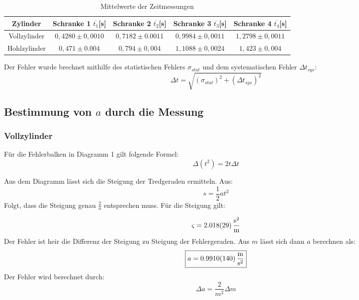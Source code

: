 \begin{table}[h!]
    \centering
    \begin{tabular}{c c c c c}
        \toprule
        Zylinder & Schranke 1 $\overline{t_1}$[s] & Schranke 2 $\overline{t_2}$[s] & Schranke 3 $\overline{t_3}$[s] & Schranke 4 $\overline{t_4}$[s] \\
        \midrule
        Vollzylinder & $0,4280 \pm 0,0010 $ & $ 0,7182 \pm 0.0011$ & $0,9984 \pm 0,0011 $ & $ 1,2798 \pm 0,0011$\\
        Hohlzylinder & $0,471 \pm 0.004$ & $0,794 \pm 0,004$ & $1,1088 \pm 0,0024$ & $1,423 \pm 0,004$\\
        \bottomrule
    \end{tabular}
    \caption{Mittelwerte der Zeitmessungen}
\end{table}

Der Fehler wurde brechnet mithilfe des statistischen Fehlers $\sigma_{stat}$ und dem systematischen Fehler $\Delta t_{sys}$:
\begin{equation}
    \Delta t = \sqrt{(\sigma_{stat})^2 + (\Delta t_{sys})^2}
    \label{eq:FehlerTab}
\end{equation}

\subsection{Bestimmung von $a$ durch die Messung}

\subsubsection{Vollzylinder}

Für die Fehlerbalken in Diagramm 1 gilt folgende Formel:
\begin{equation}
    \Delta (t^2) = 2t\Delta t
\end{equation}

Aus dem Diagramm lässt sich die Steigung der Tredgeraden ermitteln.
Aus:
\begin{equation}
    s = \frac{1}{2} at^2
\end{equation}
Folgt, dass die Steigung genau $\frac{2}{a}$ entsprechen muss.
Für die Steigung gilt:

\[\varsigma = \SI{2.018 \pm 0,029}{\frac{\second^2}{\meter}} \]
Der Fehler ist heir die Differenz der Steigung zu Steigung der Fehlergeraden.
Aus $m$ lässt sich dann $a$ berechnen als:
\[\boxed{a = \SI{ 0,9910 \pm 0,014 }{\frac{\meter}{\second^2}}}\]
Der Fehler wird berechnet durch:
\begin{equation}
    \Delta a = \frac{2}{m^2}\Delta m
\end{equation}


